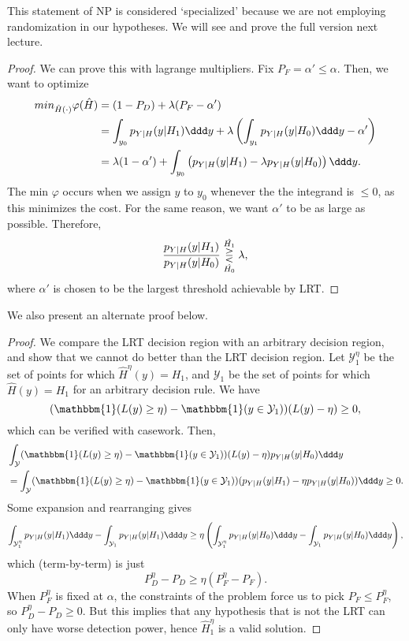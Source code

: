 This statement of NP is considered `specialized' because we are not employing randomization in our hypotheses. We will see and prove the full version next lecture. 

\begin{proof}
We can prove this with lagrange multipliers. Fix $P_F = \alpha' \leq \alpha$. Then, we want to optimize
\begin{align*}
	min_{\hat{H}(\cdot)} \varphi(\hat{H}) &= (1-P_D) + \lambda(P_F-\alpha') \\
	&= \int_{y_0}p_{Y|H}(y|H_1)\ddd y + \lambda \left( \int_{y_1}p_{Y|H}(y|H_0)\ddd y - \alpha' \right) \\
	&= \lambda(1-\alpha') + \int_{y_0}\left(p_{Y|H}(y|H_1) - \lambda p_{Y|H}(y|H_0)\right) \ddd y.
\end{align*}
The min $\varphi$ occurs when we assign $y$ to $y_0$ whenever the the integrand is $\leq 0$, as this minimizes the cost. For the same reason, we want $\alpha'$ to be as large as possible. Therefore, 
\[\frac{p_{Y|H}(y|H_1)}{p_{Y|H}(y|H_0)}\overunderset{\hat{H_1}}{\hat{H_0}}{\gtreqless}\lambda,\]
where $\alpha'$ is chosen to be the largest threshold achievable by LRT. 
\end{proof}

\noindent We also present an alternate proof below.

\begin{proof}
	We compare the LRT decision region with an arbitrary decision region, and show that we cannot do better than the LRT decision region. Let $\mathcal{Y}_1^{\eta}$ be the set of points for which $\hat{H}^{\eta}(y)=H_1$, and $\mathcal{Y}_1$ be the set of points for which $\hat{H}(y)=H_1$ for an arbitrary decision rule. We have 
	\[(\mathbbm{1}(L(y)\geq \eta) - \mathbbm{1}(y\in \mathcal{Y}_1))(L(y)-\eta)\geq 0,\] 
which can be verified with casework. Then, 
\begin{align*}
	&\int_{\mathcal{Y}} (\mathbbm{1}(L(y)\geq \eta) - \mathbbm{1}(y\in \mathcal{Y}_1))(L(y)-\eta)p_{Y|H}(y|H_0) \ddd y \\
	&= \int_{\mathcal{Y}} (\mathbbm{1}(L(y)\geq \eta) - \mathbbm{1}(y\in \mathcal{Y}_1))(p_{Y|H}(y|H_1) - \eta p_{Y|H}(y|H_0))\ddd y\geq 0.
\end{align*}
Some expansion and rearranging gives 
\[\int_{\mathcal{Y}_1^{\eta}}p_{Y|H}(y|H_1)\ddd y - \int_{\mathcal{Y}_1}p_{Y|H}(y|H_1)\ddd y\geq \eta\left(\int_{\mathcal{Y}_1^{\eta}}p_{Y|H}(y|H_0)\ddd y - \int_{\mathcal{Y}_1}p_{Y|H}(y|H_0)\ddd y\right),\]
which (term-by-term) is just 
\[P^{\eta}_D - P_D \geq \eta(P_F^{\eta} - P_F).\] 
When $P_F^{\eta}$ is fixed at $\alpha$, the constraints of the problem force us to pick $P_F\leq P_F^{\eta}$, so $P^{\eta}_D-P_D\geq 0$. But this implies that any hypothesis that is not the LRT can only have worse detection power, hence $\hat{H}^{\eta}_1$ is a valid solution.
\end{proof}


